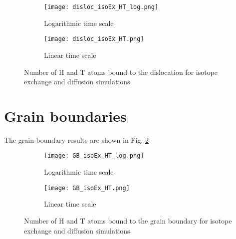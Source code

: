 \begin{figure}[ht]
\begin{subfigure}{.5\textwidth}
  \centering
 \texttt{[image: disloc\_isoEx\_HT\_log.png]}  
  \caption{Logarithmic time scale}
\end{subfigure}
\begin{subfigure}{.5\textwidth}
  \centering
  \texttt{[image: disloc\_isoEx\_HT.png]}  
  \caption{Linear time scale}
\end{subfigure}
   \caption{Number of H and T atoms bound to the dislocation for isotope exchange and diffusion simulations}
   \label{Fig:disloc_results} 
\end{figure}



\section{Grain boundaries}
The grain boundary results are shown in Fig. \ref{Fig:GB_results}

\begin{figure}[ht]
\begin{subfigure}{.5\textwidth}
  \centering
 \texttt{[image: GB\_isoEx\_HT\_log.png]}  
  \caption{Logarithmic time scale}
\end{subfigure}
\begin{subfigure}{.5\textwidth}
  \centering
  \texttt{[image: GB\_isoEx\_HT.png]}  
  \caption{Linear time scale}
\end{subfigure}
   \caption{Number of H and T atoms bound to the grain boundary for isotope exchange and diffusion simulations}
   \label{Fig:GB_results} 
\end{figure}

